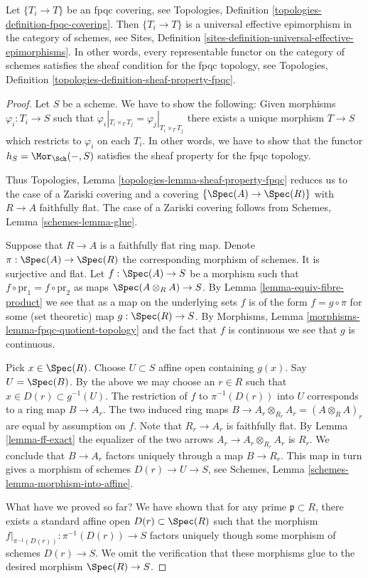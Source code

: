 \begin{lemma}
\label{lemma-fpqc-universal-effective-epimorphisms}
Let $\{T_i \to T\}$ be an fpqc covering, see
Topologies, Definition \ref{topologies-definition-fpqc-covering}.
Then $\{T_i \to T\}$ is a universal effective epimorphism
in the category of schemes, see
Sites, Definition \ref{sites-definition-universal-effective-epimorphisms}.
In other words, every representable functor on the category of schemes
satisfies the sheaf condition for the fpqc topology, see
Topologies, Definition \ref{topologies-definition-sheaf-property-fpqc}.
\end{lemma}

\begin{proof}
Let $S$ be a scheme. We have to show the following:
Given morphisms $\varphi_i : T_i \to S$
such that $\varphi_i|_{T_i \times_T T_j} = \varphi_j|_{T_i \times_T T_j}$
there exists a unique morphism $T \to S$ which restricts
to $\varphi_i$ on each $T_i$.
In other words, we have to show that the functor
$h_S = \Mor_{\Sch}( - , S)$ satisfies
the sheaf property for the fpqc topology.

\medskip\noindent
Thus Topologies, Lemma \ref{topologies-lemma-sheaf-property-fpqc}
reduces us to the case of a Zariski covering and a covering
$\{\Spec(A) \to \Spec(R)\}$ with $R \to A$ faithfully flat.
The case of a Zariski covering follows from
Schemes, Lemma \ref{schemes-lemma-glue}.

\medskip\noindent
Suppose that $R \to A$ is a faithfully flat ring map.
Denote $\pi : \Spec(A) \to \Spec(R)$ the
corresponding morphism of schemes. It is surjective and flat.
Let $f : \Spec(A) \to S$ be a morphism
such that $f \circ \text{pr}_1 = f \circ \text{pr}_2$
as maps $\Spec(A \otimes_R A) \to S$.
By Lemma \ref{lemma-equiv-fibre-product} we see that
as a map on the underlying
sets $f$ is of the form $f = g \circ \pi$ for some
(set theoretic) map $g : \Spec(R) \to S$.
By Morphisms, Lemma \ref{morphisms-lemma-fpqc-quotient-topology}
and the fact that $f$ is continuous we see that $g$
is continuous.

\medskip\noindent
Pick $x \in \Spec(R)$.
Choose $U \subset S$ affine open containing $g(x)$.
Say $U = \Spec(B)$.
By the above we may choose an $r \in R$ such that
$x \in D(r) \subset g^{-1}(U)$.
The restriction of $f$ to $\pi^{-1}(D(r))$ into $U$
corresponds to a ring map $B \to A_r$. The two induced
ring maps $B \to A_r \otimes_{R_r} A_r = (A \otimes_R A)_r$ are equal
by assumption on $f$.
Note that $R_r \to A_r$ is faithfully flat.
By Lemma \ref{lemma-ff-exact} the equalizer of
the two arrows $A_r \to A_r \otimes_{R_r} A_r$ is $R_r$.
We conclude that $B \to A_r$ factors uniquely through a map $B \to R_r$.
This map in turn gives a morphism of schemes $D(r) \to U \to S$,
see Schemes, Lemma \ref{schemes-lemma-morphism-into-affine}.

\medskip\noindent
What have we proved so far? We have shown that for any prime
$\mathfrak p \subset R$, there exists a standard affine open
$D(r) \subset \Spec(R)$ such that the morphism
$f|_{\pi^{-1}(D(r))} : \pi^{-1}(D(r)) \to S$ factors uniquely
though some morphism of schemes $D(r) \to S$. We omit the
verification that these morphisms glue to the desired
morphism $\Spec(R) \to S$.
\end{proof}
